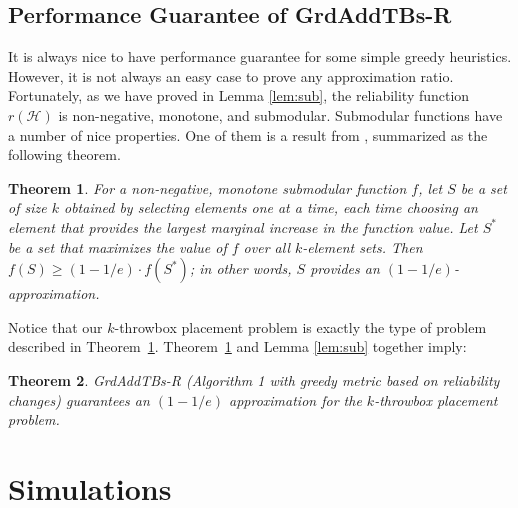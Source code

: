 \documentclass[10pt,conference,compsocconf,letterpaper]{IEEEtran}
\newtheorem{Theorem}{Theorem}
\begin{document}
\subsection{Performance Guarantee of GrdAddTBs-R}

It is always nice to have performance guarantee for some simple greedy heuristics. However, it is not always an easy case to prove any approximation ratio. Fortunately, as we have proved in  Lemma \ref{lem:sub}, the reliability  function $r(\mathcal{H})$ is non-negative, monotone, and submodular. Submodular functions have a number of nice properties. One of them is a result from \cite{cornuejols1977location,NWF78}, summarized as the following theorem.

\begin{Theorem}
\label{the:nature}For a non-negative, monotone submodular function $f$, let $S$ be a set of size $k$ obtained by selecting elements one at a time, each time choosing an element that provides the largest marginal increase in the function value. Let $S^*$ be a set that maximizes the value of $f$ over all $k$-element sets. Then $f(S)\geq (1-1/e)\cdot f(S^*)$; in other words, $S$ provides an $(1-1/e)$-approximation.
\end{Theorem}

Notice that our $k$-throwbox placement problem is exactly the type of problem described in Theorem~\ref{the:nature}. Theorem~\ref{the:nature} and Lemma \ref{lem:sub} together imply:

\begin{Theorem}\label{theo:appr-k}
GrdAddTBs-R (Algorithm 1 with greedy metric based on reliability changes) guarantees an
$(1-1/e)$ approximation for the $k$-throwbox placement problem.
\end{Theorem}

\section{Simulations}
\label{sec:sim}
\end{document}

